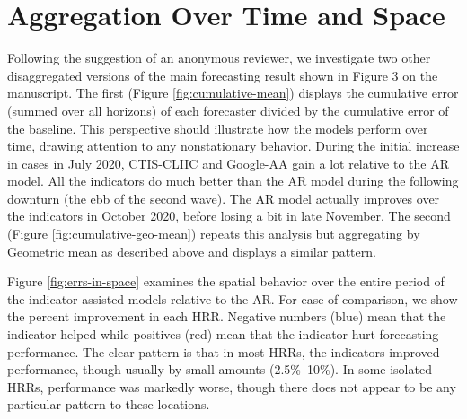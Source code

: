 

\section{Aggregation Over Time and Space}

Following the suggestion of an anonymous reviewer, we investigate two
other disaggregated versions of the main forecasting result shown in Figure 3 on the
manuscript. The first (Figure \ref{fig:cumulative-mean}) displays the cumulative
error (summed over all horizons) of each forecaster divided by the cumulative
error of the baseline.  This perspective should illustrate how the models
perform over time, drawing attention to any nonstationary behavior.  During the
initial increase in cases in July 2020, CTIS-CLIIC and Google-AA gain a lot
relative to the AR model. All the indicators do much better than the AR model
during the following downturn (the ebb of the second wave). The AR model
actually improves over the indicators in October 2020, before losing a bit in
late November. The second (Figure \ref{fig:cumulative-geo-mean}) repeats this 
analysis but aggregating by Geometric mean as described above and displays a
similar pattern.

Figure \ref{fig:errs-in-space} examines the spatial behavior over the entire
period of the indicator-assisted models relative to the AR. For ease of
comparison, we show the percent improvement in each HRR. Negative numbers (blue)
mean that the indicator helped while positives (red) mean that the indicator
hurt forecasting performance. The clear pattern is that in most HRRs, the
indicators improved performance, though usually by small amounts (2.5\%--10\%).
In some isolated HRRs, performance was markedly worse, though there does not
appear to be any particular pattern to these locations.
